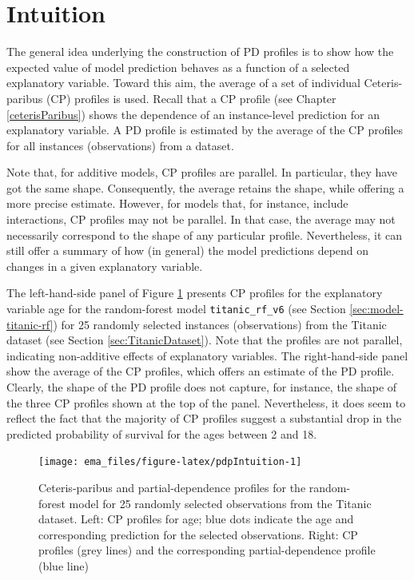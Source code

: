 \documentclass[]{krantz}
\begin{document}
\hypertarget{PDPIntuition}{%
\section{Intuition}\label{PDPIntuition}}

The general idea underlying the construction of PD profiles is to show how the expected value of model prediction behaves as a function of a selected explanatory variable. Toward this aim, the average of a set of individual Ceteris-paribus (CP) profiles is used. Recall that a CP profile (see Chapter \ref{ceterisParibus}) shows the dependence of an instance-level prediction for an explanatory variable. A PD profile is estimated by the average of the CP profiles for all instances (observations) from a dataset.

Note that, for additive models, CP profiles are parallel. In particular, they have got the same shape. Consequently, the average retains the shape, while offering a more precise estimate. However, for models that, for instance, include interactions, CP profiles may not be parallel. In that case, the average may not necessarily correspond to the shape of any particular profile. Nevertheless, it can still offer a summary of how (in general) the model predictions depend on changes in a given explanatory variable.

The left-hand-side panel of Figure \ref{fig:pdpIntuition} presents CP profiles for the explanatory variable age for the random-forest model \texttt{titanic\_rf\_v6} (see Section \ref{sec:model-titanic-rf}) for 25 randomly selected instances (observations) from the Titanic dataset (see Section \ref{sec:TitanicDataset}). Note that the profiles are not parallel, indicating non-additive effects of explanatory variables. The right-hand-side panel show the average of the CP profiles, which offers an estimate of the PD profile. Clearly, the shape of the PD profile does not capture, for instance, the shape of the three CP profiles shown at the top of the panel. Nevertheless, it does seem to reflect the fact that the majority of CP profiles suggest a substantial drop in the predicted probability of survival for the ages between 2 and 18.

\begin{figure}

{\centering \texttt{[image: ema\_files/figure-latex/pdpIntuition-1]} 

}

\caption{Ceteris-paribus and partial-dependence profiles for the random-forest model for 25 randomly selected observations from the Titanic dataset. Left: CP profiles for age; blue dots indicate the age and corresponding prediction for the selected observations. Right: CP profiles (grey lines) and the corresponding partial-dependence profile (blue line)}\label{fig:pdpIntuition}
\end{figure}
\end{document}
